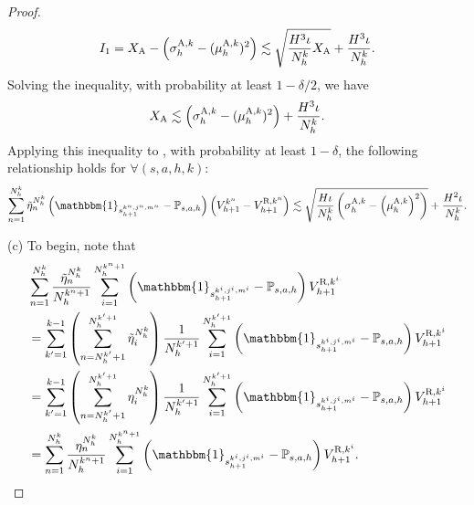 \documentclass{article}
\newcommand{\R}{\textnormal{R}}
\newcommand{\A}{\textnormal{A}}
\begin{document}
\begin{proof}
    $$I_1 = X_{\A}-\left(\sigma_h^{\A,k}-(\mu_h^{\A,k})^2\right) \lesssim  \sqrt{\frac{H^3\iota}{N_h^k}X_{\A}} + \frac{H^3\iota}{N_h^k}.$$
    Solving the inequality, with probability at least $1-\delta/2$, we have
    $$X_{\A} \lesssim \left(\sigma_h^{\A,k}-(\mu_h^{\A,k})^2\right) + \frac{H^3\iota}{N_h^k}.$$
    Applying this inequality to , with probability at least $1-\delta$, the following relationship holds for $\forall (s,a,h,k)$:
    $$\sum_{n=1}^{N_h^k} \Tilde{\eta}_n^{N_h^k}\left(\mathbbm{1}_{s_{h+1}^{k^n,j^n,m^n}}-\mathbb{P}_{s,a,h}\right) \left(V_{h+1}^{k^n} - V_{h+1}^{\R,k^n} \right) \lesssim \sqrt{\frac{H\iota}{N_h^k}\left(\sigma_h^{\A,k}-\left(\mu_h^{\A,k}\right)^2\right)} + \frac{H^2\iota}{N_h^k}.$$

    (c) To begin, note that
    \begin{align}
    \label{refpositive}
         &\sum_{n=1}^{N_h^k} \frac{\Tilde{\eta}_n^{N_h^k}} {N_h^{k^n+1}}\sum_{i=1}^{N_h^{k^n+1}}\left(\mathbbm{1}_{s_{h+1}^{k^i,j^i,m^i}}-\mathbb{P}_{s,a,h}\right)V_{h+1}^{\R,k^i} \nonumber\\
         &= \sum_{k'=1}^{k-1}\left(\sum_{n=N_h^{k'}+1}^{N_h^{k'+1}}\Tilde{\eta}_i^{N_h^k}\right)\frac{1} {N_h^{k'+1}}\sum_{i=1}^{N_h^{k'+1}}\left(\mathbbm{1}_{s_{h+1}^{k^i,j^i,m^i}}-\mathbb{P}_{s,a,h}\right)V_{h+1}^{\R,k^i}\nonumber\\
         & = \sum_{k'=1}^{k-1}\left(\sum_{n=N_h^{k'}+1}^{N_h^{k'+1}}\eta_i^{N_h^k}\right)\frac{1} {N_h^{k'+1}}\sum_{i=1}^{N_h^{k'+1}}\left(\mathbbm{1}_{s_{h+1}^{k^i,j^i,m^i}}-\mathbb{P}_{s,a,h}\right)V_{h+1}^{\R,k^i}\nonumber\\
         & = \sum_{n=1}^{N_h^k} \frac{\eta_n^{N_h^k}} {N_h^{k^n+1}}\sum_{i=1}^{N_h^{k^n+1}}\left(\mathbbm{1}_{s_{h+1}^{k^i,j^i,m^i}}-\mathbb{P}_{s,a,h}\right)V_{h+1}^{\R,k^i}.
    \end{align}
   

\end{proof}
\end{document}
